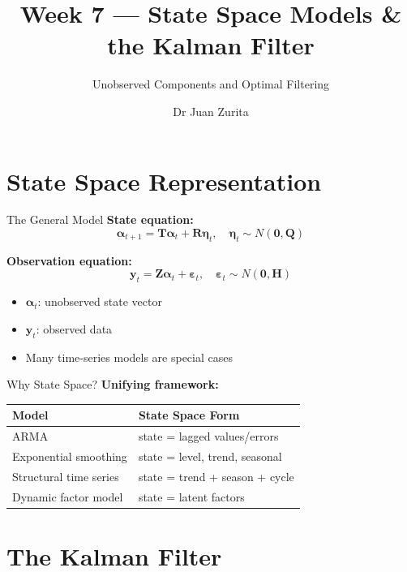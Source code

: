 \documentclass[aspectratio=169, 10pt]{beamer}
\title{Week 7 --- State Space Models \& the Kalman Filter}
\subtitle{Unobserved Components and Optimal Filtering}
\author{Dr Juan Zurita}
\institute{Economic \& Business Forecasting\\
The University of Edinburgh~$\cdot$~School of Economics}
\date{}
\begin{document}
\maketitle


\section{State Space Representation}

\begin{frame}{The General Model}
\textbf{State equation:}
\[
\boldsymbol{\alpha}_{t+1} = \mathbf{T}\boldsymbol{\alpha}_t + \mathbf{R}\boldsymbol{\eta}_t, \quad \boldsymbol{\eta}_t \sim N(\mathbf{0}, \mathbf{Q})
\]

\textbf{Observation equation:}
\[
\mathbf{y}_t = \mathbf{Z}\boldsymbol{\alpha}_t + \boldsymbol{\varepsilon}_t, \quad \boldsymbol{\varepsilon}_t \sim N(\mathbf{0}, \mathbf{H})
\]

\begin{itemize}
    \item $\boldsymbol{\alpha}_t$: \alert{unobserved} state vector
    \item $\mathbf{y}_t$: observed data
    \item Many time-series models are special cases
\end{itemize}
\end{frame}

\begin{frame}{Why State Space?}
\textbf{Unifying framework:}
\begin{center}
\begin{tabular}{ll}
\toprule
\textbf{Model} & \textbf{State Space Form} \\
\midrule
ARMA & state = lagged values/errors \\
Exponential smoothing & state = level, trend, seasonal \\
Structural time series & state = trend + season + cycle \\
Dynamic factor model & state = latent factors \\
\bottomrule
\end{tabular}
\end{center}
\end{frame}

\section{The Kalman Filter}
\end{document}
